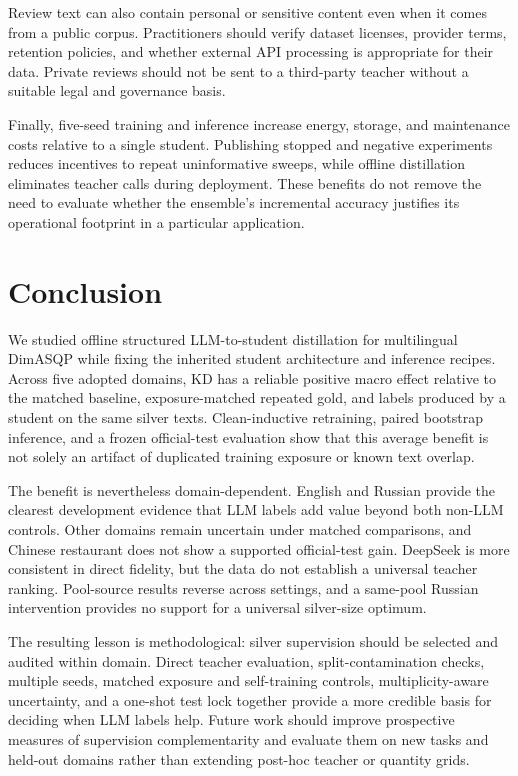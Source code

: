 Review text can also contain personal or sensitive content even when it
comes from a public corpus. Practitioners should verify dataset
licenses, provider terms, retention policies, and whether external API
processing is appropriate for their data. Private reviews should not be
sent to a third-party teacher without a suitable legal and governance
basis.

Finally, five-seed training and inference increase energy, storage, and
maintenance costs relative to a single student. Publishing stopped and
negative experiments reduces incentives to repeat uninformative sweeps,
while offline distillation eliminates teacher calls during deployment.
These benefits do not remove the need to evaluate whether the ensemble's
incremental accuracy justifies its operational footprint in a particular
application.

\section{Conclusion}\label{conclusion}

We studied offline structured LLM-to-student distillation for
multilingual DimASQP while fixing the inherited student architecture and
inference recipes. Across five adopted domains, KD has a reliable
positive macro effect relative to the matched baseline, exposure-matched
repeated gold, and labels produced by a student on the same silver
texts. Clean-inductive retraining, paired bootstrap inference, and a
frozen official-test evaluation show that this average benefit is not
solely an artifact of duplicated training exposure or known text
overlap.

The benefit is nevertheless domain-dependent. English and Russian
provide the clearest development evidence that LLM labels add value
beyond both non-LLM controls. Other domains remain uncertain under
matched comparisons, and Chinese restaurant does not show a supported
official-test gain. DeepSeek is more consistent in direct fidelity, but
the data do not establish a universal teacher ranking. Pool-source
results reverse across settings, and a same-pool Russian intervention
provides no support for a universal silver-size optimum.

The resulting lesson is methodological: silver supervision should be
selected and audited within domain. Direct teacher evaluation,
split-contamination checks, multiple seeds, matched exposure and
self-training controls, multiplicity-aware uncertainty, and a one-shot
test lock together provide a more credible basis for deciding when LLM
labels help. Future work should improve prospective measures of
supervision complementarity and evaluate them on new tasks and held-out
domains rather than extending post-hoc teacher or quantity grids.
